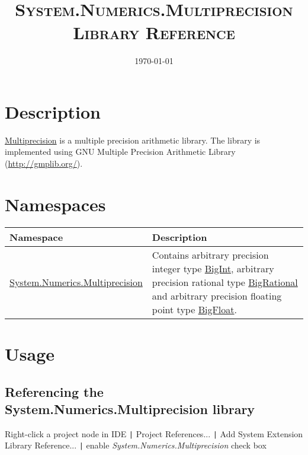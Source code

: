 \documentclass[a4paper,oneside,11.000000pt]{book}
\begin{document}
\clearpage

\frontmatter
\title{\textsc{System.Numerics.Multiprecision Library Reference}
}
\date{\today}
\maketitle
\tableofcontents

\clearpage
\chapter{Description}
\begin{flushleft}
\hyperlink{System.Numerics.Multiprecision}{Multiprecision} is a multiple precision arithmetic library.
The library is implemented using GNU Multiple Precision Arithmetic Library 
(\url{http://gmplib.org/}).

\end{flushleft}
\chapter{Namespaces}
\begin{flushleft}
\begin{supertabular}[l]{!{\raggedright}p{7.44777cm}!{\raggedright}p{7.70223cm}}
\textbf{Namespace}
& \textbf{Description}
\\
\hline
\hyperlink{System.Numerics.Multiprecision}{System.Numerics.Multiprecision}
& Contains arbitrary precision integer type \hyperlink{System.Numerics.Multiprecision.BigInt}{BigInt}, arbitrary precision rational type \hyperlink{System.Numerics.Multiprecision.BigRational}{BigRational} and 
arbitrary precision floating point type \hyperlink{System.Numerics.Multiprecision.BigFloat}{BigFloat}.

\\
\end{supertabular}

\end{flushleft}
\clearpage
\mainmatter

\chapter{Usage}

\section{Referencing the System.Numerics.Multiprecision library}

Right-click a project node in IDE \verb.|. Project References... \verb.|.
Add System Extension Library Reference... \verb.|.
enable \emph{System.Numerics.Multiprecision} check box
\end{document}
